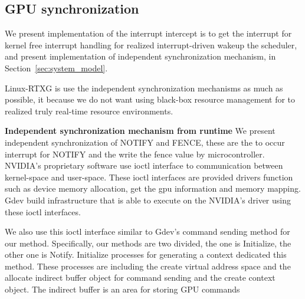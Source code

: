 \subsection{GPU synchronization}
We present implementation of the interrupt intercept is to get the interrupt for kernel free interrupt handling for realized interrupt-driven wakeup the scheduler, and present implementation of independent synchronization mechanism, in Section~\ref{sec:system_model}.

Linux-RTXG is use the independent synchronization mechanisms as much as possible,
it because we do not want using black-box resource management for to realized truly real-time resource environments.


\textbf{Independent synchronization mechanism from runtime}
We present independent synchronization of NOTIFY and FENCE, these are the to occur interrupt for NOTIFY and the write the fence value by microcontroller.
NVIDIA's proprietary software use ioctl interface to communication between kernel-space and user-space.
These ioctl interfaces are provided drivers function such as device memory allocation, get the gpu information and memory mapping.
Gdev build infrastructure that is able to execute on the NVIDIA's driver using these ioctl interfaces.

We also use this ioctl interface similar to Gdev's command sending method for our method.
Specifically, our methods are two divided, the one is Initialize, the other one is Notify.
Initialize processes for generating a context dedicated this method.
These processes are including the create virtual address space and the allocate indirect buffer object for command sending and the create context object.
The indirect buffer is an area for storing GPU commands

